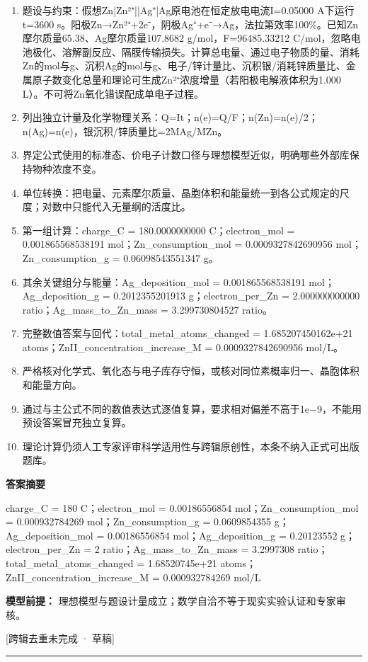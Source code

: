 \documentclass[UTF8,11pt,a4paper]{ctexart}
\begin{document}
\begin{enumerate}
\item 题设与约束：假想Zn|Zn²⁺||Ag⁺|Ag原电池在恒定放电电流I=0.05000 A下运行t=3600 s。阳极Zn→Zn²⁺+2e⁻，阴极Ag⁺+e⁻→Ag，法拉第效率100\%。已知Zn摩尔质量65.38、Ag摩尔质量107.8682 g/mol，F=96485.33212 C/mol，忽略电池极化、溶解副反应、隔膜传输损失。计算总电量、通过电子物质的量、消耗Zn的mol与g、沉积Ag的mol与g、电子/锌计量比、沉积银/消耗锌质量比、金属原子数变化总量和理论可生成Zn²⁺浓度增量（若阳极电解液体积为1.000 L）。不可将Zn氧化错误配成单电子过程。
\item 列出独立计量及化学物理关系：Q=It；n(e)=Q/F；n(Zn)=n(e)/2；n(Ag)=n(e)，银沉积/锌质量比=2MAg/MZn。
\item 界定公式使用的标准态、价电子计数口径与理想模型近似，明确哪些外部库保持物种浓度不变。
\item 单位转换：把电量、元素摩尔质量、晶胞体积和能量统一到各公式规定的尺度；对数中只能代入无量纲的活度比。
\item 第一组计算：charge\_C = 180.0000000000 C；electron\_mol = 0.001865568538191 mol；Zn\_consumption\_mol = 0.0009327842690956 mol；Zn\_consumption\_g = 0.06098543551347 g。
\item 其余关键组分与能量：Ag\_deposition\_mol = 0.001865568538191 mol；Ag\_deposition\_g = 0.2012355201913 g；electron\_per\_Zn = 2.000000000000 ratio；Ag\_mass\_to\_Zn\_mass = 3.299730804527 ratio。
\item 完整数值答案与回代：total\_metal\_atoms\_changed = 1.685207450162e+21 atoms；ZnII\_concentration\_increase\_M = 0.0009327842690956 mol/L。
\item 严格核对化学式、氧化态与电子库存守恒，或核对同位素概率归一、晶胞体积和能量方向。
\item 通过与主公式不同的数值表达式逐值复算，要求相对偏差不高于1e−9，不能用预设答案冒充独立复算。
\item 理论计算仍须人工专家评审科学适用性与跨辑原创性，本条不纳入正式可出版题库。
\end{enumerate}
\noindent\textbf{答案摘要}\par
charge\_C = 180 C；electron\_mol = 0.00186556854 mol；Zn\_consumption\_mol = 0.000932784269 mol；Zn\_consumption\_g = 0.0609854355 g；Ag\_deposition\_mol = 0.00186556854 mol；Ag\_deposition\_g = 0.20123552 g；electron\_per\_Zn = 2 ratio；Ag\_mass\_to\_Zn\_mass = 3.2997308 ratio；total\_metal\_atoms\_changed = 1.68520745e+21 atoms；ZnII\_concentration\_increase\_M = 0.000932784269 mol/L\par
\noindent\textbf{模型前提：}
理想模型与题设计量成立；数学自洽不等于现实实验认证和专家审核。\par
\noindent\textcolor{red!65!black}{[跨辑去重未完成 · 草稿]} \par
\medskip\hrule\medskip
{}
\end{document}
